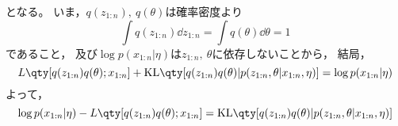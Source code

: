\documentclass[dvipdfmx, fleqn]{jsarticle}
\begin{document}
となる。
いま，\(q(z_{1:n}),\ q(\theta)\)は確率密度より
\begin{equation}
    \int q(z_{1:n}) \dd{z_{1:n}} = \int q(\theta) \dd{\theta} = 1
\end{equation}
であること，
及び\(\log{p(x_{1:n} | \eta)}\)は\(z_{1:n},\ \theta\)に依存しないことから，
結局，
\begin{equation}
    L\qty[q(z_{1:n}) q(\theta); x_{1:n}] + \mathrm{KL}\qty[q(z_{1:n}) q(\theta) | p(z_{1:n}, \theta | x_{1:n}, \eta)] = \log{p(x_{1:n} | \eta)}
\end{equation}
よって，
\begin{equation}
    \log{p(x_{1:n} | \eta)} - L\qty[q(z_{1:n}) q(\theta); x_{1:n}] = \mathrm{KL}\qty[q(z_{1:n}) q(\theta) | p(z_{1:n}, \theta | x_{1:n}, \eta)]
\end{equation}
\end{document}
